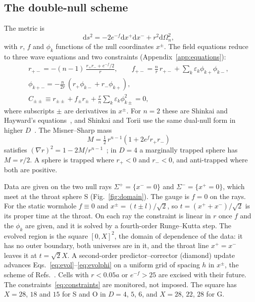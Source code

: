\documentclass[11pt]{article}
\newcommand{\dd}{\mathrm{d}}
\begin{document}
\subsection{The double-null scheme}\label{sec:scheme}

The metric is
\begin{equation}
\dd s^2=-2e^{-f}\dd x^+\dd x^-+r^2\dd\Omega_n^2,
\end{equation}
with $r$, $f$ and $\phi_k$ functions of the null coordinates $x^\pm$. The field equations reduce to three wave
equations and two constraints (Appendix~\ref{app:equations}):
\begin{gather}
r_{+-}=-(n-1)\,\frac{r_+r_-+e^{-f}/2}{r},\qquad f_{+-}=\frac{n}{r}\,r_{+-}+\sum_k\varepsilon_k\phi_{k+}\phi_{k-},
\label{eq:evol}\\
\phi_{k+-}=-\frac{n}{2r}\,(r_+\phi_{k-}+r_-\phi_{k+}),\label{eq:evolphi}\\
C_{\pm\pm}\equiv r_{\pm\pm}+f_\pm r_\pm+\frac{r}{n}\sum_k\varepsilon_k\phi_{k\pm}^2=0,\label{eq:constraints}
\end{gather}
where subscripts $\pm$ are derivatives in $x^\pm$. For $n=2$ these are Shinkai and Hayward's equations~\cite{SH2002},
and Shinkai and Torii use the same dual-null form in higher $D$~\cite{ST2017}. The Misner--Sharp mass
\begin{equation}
M=\tfrac12\,r^{n-1}\left(1+2e^{f}r_+r_-\right)\label{eq:ms}
\end{equation}
satisfies $(\nabla r)^2=1-2M/r^{n-1}$~\cite{MisnerSharp1964}; in $D=4$ a marginally trapped sphere has $M=r/2$. A sphere
is trapped where $r_+<0$ and $r_-<0$, and anti-trapped where both are positive.

Data are given on the two null rays $\Sigma^+=\{x^-=0\}$ and $\Sigma^-=\{x^+=0\}$, which meet at the throat sphere S
(Fig.~\ref{fig:domain}). The gauge is $f=0$ on the rays. For the static wormhole $f\equiv0$ and $x^\pm=(t\pm l)/\sqrt2$,
so $t=(x^++x^-)/\sqrt2$ is its proper time at the throat. On each ray the constraint is linear in $r$ once $f$ and the
$\phi_k$ are given, and it is solved by a fourth-order Runge--Kutta step. The evolved region is the square
$[0,X]^2$, the domain of dependence of the data: it has no outer boundary, both universes are in it, and the throat line
$x^+=x^-$ leaves it at $t=\sqrt2X$. A second-order predictor--corrector (diamond) update advances
Eqs.~\eqref{eq:evol}--\eqref{eq:evolphi} on a uniform grid of spacing $h$ in $x^\pm$, the scheme of Refs.~\cite{SH2002,ST2017}. Cells with
$r<0.05a$ or $e^{-f}>25$ are excised with their future. The constraints~\eqref{eq:constraints} are monitored, not
imposed. The square has $X=28$, $18$ and $15$ for S and O in $D=4$, $5$, $6$, and $X=28$, $22$, $28$ for G.
\end{document}

